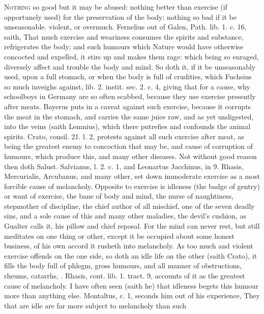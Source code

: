 {\lettrine{N}{othing} so good but it may be abused: nothing better than exercise (if
opportunely used) for the preservation of the body: nothing so bad if
it be unseasonable. violent, or overmuch. Fernelius out of Galen, Path.
lib. 1. c. 16, saith, That much exercise and weariness consumes
the spirits and substance, refrigerates the body; and such humours
which Nature would have otherwise concocted and expelled, it stirs up
and makes them rage: which being so enraged, diversely affect and
trouble the body and mind. So doth it, if it be unseasonably used, upon
a full stomach, or when the body is full of crudities, which Fuchsius
so much inveighs against, lib. 2. instit. sec. 2. c. 4, giving that for
a cause, why schoolboys in Germany are so often scabbed, because they
use exercise presently after meats. Bayerus puts in a caveat
against such exercise, because it corrupts the meat in the
stomach, and carries the same juice raw, and as yet undigested, into
the veins (saith Lemnius), which there putrefies and confounds the
animal spirits. Crato, consil. 21. l. 2, protests against all
such exercise after meat, as being the greatest enemy to concoction
that may be, and cause of corruption of humours, which produce this,
and many other diseases. Not without good reason then doth Salust.
Salvianus, l. 2. c. 1, and Leonartus Jacchinus, in 9. Rhasis,
Mercurialis, Arcubanus, and many other, set down immoderate
exercise as a most forcible cause of melancholy.
Opposite to exercise is idleness (the badge of gentry) or want of
exercise, the bane of body and mind, the nurse of naughtiness,
stepmother of discipline, the chief author of all mischief, one of the
seven deadly sins, and a sole cause of this and many other maladies,
the devil's cushion, as Gualter calls it, his pillow and chief
reposal. For the mind can never rest, but still meditates on one thing
or other, except it be occupied about some honest business, of his own
accord it rusheth into melancholy. As too much and violent
exercise offends on the one side, so doth an idle life on the other
(saith Crato), it fills the body full of phlegm, gross humours, and all
manner of obstructions, rheums, catarrhs, \etc{}. Rhasis, cont. lib. 1.
tract. 9, accounts of it as the greatest cause of melancholy. I
have often seen (saith he) that idleness begets this humour more than
anything else. Montaltus, c. 1, seconds him out of his experience,
They that are idle are far more subject to melancholy than such
}
